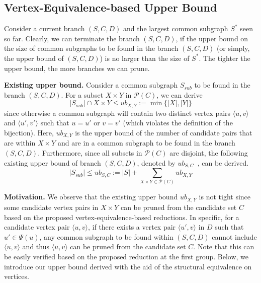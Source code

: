 \subsection{Vertex-Equivalence-based {\chengB Upper Bound}}
\label{subsec:upper-bound}
Consider a current branch $(S,C,D)$ and the largest common subgraph $S^*$ seen so far. Clearly, we can terminate the branch $(S,C,D)$, if the upper bound on the size of common subgraphs to be found in the branch $(S,C,D)$ (or simply, the upper bound of $(S,C,D)$) is no larger than the size of $S^*$. The tighter the upper bound, the more branches we can prune. 

\smallskip
\noindent\textbf{Existing upper bound.} Consider a common subgraph $S_{sub}$ to be found in the branch $(S,C,D)$. For a subset $X\times Y$ in $\mathcal{P}(C)$, we can derive
\begin{equation}
    |S_{sub}|\cap X\times Y \leq ub_{X,Y}:= \min\{|X|,|Y|\}
\end{equation}
since otherwise a common subgraph will contain two distinct vertex pairs $\langle u,v \rangle$ and $\langle u',v' \rangle$ such that $u=u'$ or $v=v'$ (which violates the definition of the bijection). Here, $ub_{X,Y}$ is the upper bound of the number of candidate pairs that are within $X\times Y$ and are in a common subgraph to be found in the branch $(S,C,D)$. Furthermore, since all subsets in $\mathcal{P}(C)$ are disjoint, 
the {\chengC following} existing upper bound of branch $(S,C,D)$, denoted by $ub_{S,C}$~\cite{mccreesh2017partitioning}, 
{\chengC can be derived}.
\begin{equation}
    |S_{sub}| \leq ub_{S,C} := |S|+\sum_{ X\times Y \in \mathcal{P}(C)} ub_{X,Y}
\end{equation}

\smallskip
\noindent\textbf{Motivation.} We observe that the existing upper bound $ub_{X,Y}$ is not tight since some candidate vertex pairs in $X\times Y$ can be pruned from the candidate set $C$ {\chengC based on} the proposed vertex-equivalence-based reductions. In specific, for a candidate vertex pair $\langle u,v \rangle$, if there exists a vertex pair $\langle u',v \rangle$ in $D$ such that $u'\in \Psi(u)$, any common subgraph to be found within $(S,C,D)$ cannot include $\langle u,v \rangle$ and thus $\langle u,v \rangle$ can be pruned from the candidate set $C$. Note that this can be easily verified based on the proposed reduction at the first group. Below, we introduce our upper bound derived with the aid of the structural equivalence on vertices.

